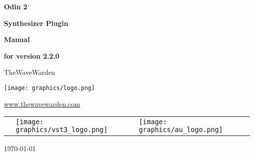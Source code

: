 \pagecolor{white!95!black}
\setlength{\parindent}{0pt}
\begin{titlepage}
	\mbox{}
	\centering
	\vspace{20mm}
	
	{\Huge\bfseries Odin 2\par}
	{\huge\bfseries Synthesizer Plugin\par}
	\vspace{2cm}
	{\Huge\bfseries Manual\par}
	{\Large\bfseries for version 2.2.0\par}
	\vspace{2cm}
	{\Large TheWaveWarden\par}
	\texttt{[image: graphics/logo.png]}\par
	{\large \url{www.thewavewarden.com}\par}

	\vspace{10mm}

	\begin{center}
		\begin{tabular}{p{}p{}p{}p{}p{}}
			&\texttt{[image: graphics/vst3\_logo.png]}& & \texttt{[image: graphics/au\_logo.png]}&
		\end{tabular}
	\end{center}

	\vfill

	{\large \today\par}
\end{titlepage}
\clearpage

\tableofcontents
\clearpage


\clearpage

\clearpage

\clearpage

\clearpage

\clearpage

\clearpage

\clearpage

\clearpage

\clearpage

